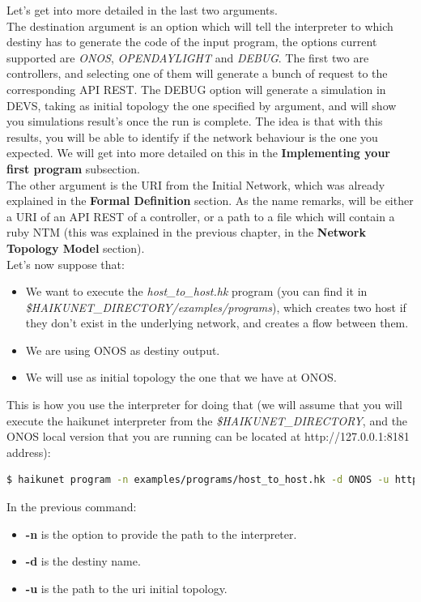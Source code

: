 Let's get into more detailed in the last two arguments.\\
The destination argument is an option which will tell the interpreter to which destiny has to generate the code of the input program, the options current supported are \textit{ONOS}, \textit{OPENDAYLIGHT} and \textit{DEBUG}. The first two are controllers, and selecting one of them will generate a bunch of request to the corresponding API REST. The DEBUG option will generate a simulation in DEVS, taking as initial topology the one specified by argument, and will show you simulations result's once the run is complete. The idea is that with this results, you will be able to identify if the network behaviour is the one you expected. We will get into more detailed on this in the \textbf{Implementing your first program} subsection.\\
The other argument is the URI from the Initial Network, which was already explained in the \textbf{Formal Definition} section. As the name remarks, will be either a URI of an API REST of a controller, or a path to a file which will contain a ruby NTM (this was explained in the previous chapter, in the \textbf{Network Topology Model} section).\\

Let's now suppose that:
\begin{itemize}
\item We want to execute the \textit{host\_to\_host.hk} program (you can find it in \textit{\$HAIKUNET\_DIRECTORY/examples/programs}), which creates two host if they don't exist in the underlying network, and creates a flow between them. 
\item We are using ONOS as destiny output.
\item We will use as initial topology the one that we have at ONOS. 
\end{itemize} 

This is how you use the interpreter for doing that (we will assume that you will execute the haikunet interpreter from the \textit{\$HAIKUNET\_DIRECTORY}, and the ONOS local version that you are running can be located at http://127.0.0.1:8181 address):

\begin{lstlisting}[language=bash,breaklines=true]
$ haikunet program -n examples/programs/host_to_host.hk -d ONOS -u http://127.0.0.1:8181/onos/v1/
\end{lstlisting}

In the previous command:
\begin{itemize}
\item \textbf{-n} is the option to provide the path to the interpreter.
\item \textbf{-d} is the destiny name.
\item \textbf{-u} is the path to the uri initial topology.
\end{itemize}

